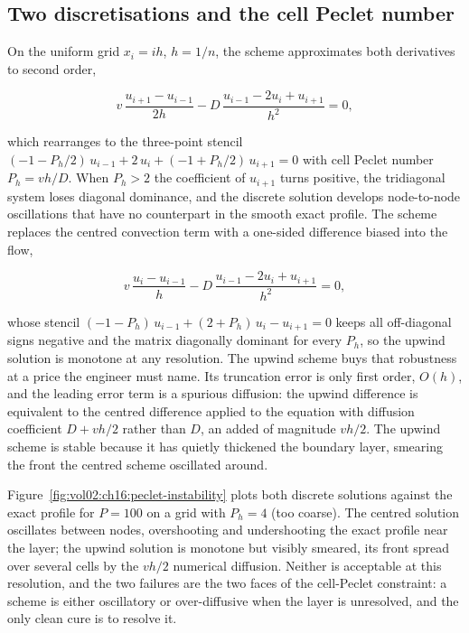 \subsection{Two discretisations and the cell Peclet number}

On the uniform grid $x_{i} = i h$, $h = 1/n$, the  scheme
approximates both derivatives to second order,

\[
v\,\frac{u_{i+1} - u_{i-1}}{2h} - D\,\frac{u_{i-1} - 2 u_{i} + u_{i+1}}{h^{2}}
= 0,
\]

which rearranges to the three-point stencil $(-1 - P_{h}/2)\,u_{i-1} +
2\,u_{i} + (-1 + P_{h}/2)\,u_{i+1} = 0$ with cell Peclet number $P_{h} =
vh/D$. When $P_{h} > 2$ the coefficient of $u_{i+1}$ turns positive, the
tridiagonal system loses diagonal dominance, and the discrete solution
develops node-to-node oscillations that have no counterpart in the smooth
exact profile. The  scheme replaces the centred convection
term with a one-sided difference biased into the flow,

\[
v\,\frac{u_{i} - u_{i-1}}{h} - D\,\frac{u_{i-1} - 2 u_{i} + u_{i+1}}{h^{2}}
= 0,
\]

whose stencil $(-1 - P_{h})\,u_{i-1} + (2 + P_{h})\,u_{i} - u_{i+1} = 0$
keeps all off-diagonal signs negative and the matrix diagonally dominant for
every $P_{h}$, so the upwind solution is monotone at any resolution. The
upwind scheme buys that robustness at a price the engineer must name. Its
truncation error is only first order, $O(h)$, and the leading error term is a
spurious diffusion: the upwind difference is equivalent to the centred
difference applied to the equation with diffusion coefficient $D + vh/2$
rather than $D$, an added  of magnitude $vh/2$.
The upwind scheme is stable because it has quietly thickened the boundary
layer, smearing the front the centred scheme oscillated around.



Figure~\ref{fig:vol02:ch16:peclet-instability} plots both discrete solutions
against the exact profile for $P = 100$ on a grid with $P_{h} = 4$ (too
coarse). The centred solution oscillates between nodes, overshooting and
undershooting the exact profile near the layer; the upwind solution is
monotone but visibly smeared, its front spread over several cells by the
$vh/2$ numerical diffusion. Neither is acceptable at this resolution, and the
two failures are the two faces of the cell-Peclet constraint: a scheme is
either oscillatory or over-diffusive when the layer is unresolved, and the
only clean cure is to resolve it.


